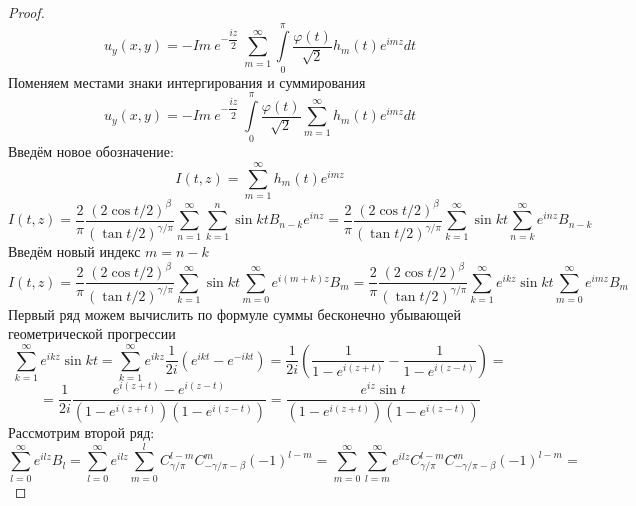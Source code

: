 \documentclass[12pt, a4paper]{extarticle}
\numberwithin{equation}{section}
\numberwithin{lemma}{section}
\numberwithin{definition}{section}
\numberwithin{notabene}{section}
\numberwithin{corollary}{section}
\begin{document}
\begin{proof}
\begin{equation*}
	\end{equation*}
	\begin{equation*}
	u_y(x,y)  = -  Im \ e^{-\dfrac{iz}{2}}\ \sum\limits_{m=1}^{\infty}  \int\limits_0^\pi \dfrac{\varphi(t)}{\sqrt2}  h_{m}(t)  e^{im z}  dt
\end{equation*}
	Поменяем местами знаки интергирования и суммирования
	\begin{equation*}
		u_y(x,y)  = -  Im \ e^{-\dfrac{iz}{2}}\  \int\limits_0^\pi \dfrac{\varphi(t)}{\sqrt2}  \sum\limits_{m=1}^{\infty}   h_{m}(t)  e^{im z}  dt
	\end{equation*}
	Введём новое обозначение:
	\begin{equation*}
		I(t,z) = \sum\limits_{m=1}^{\infty}  h_{m}(t)  e^{im z}
	\end{equation*}
	\begin{equation*}
		I(t,z) =\dfrac{2}{\pi}\dfrac{(2\cos{t/2})^\beta}{(\tan{t/2})^{\gamma/\pi}} \sum\limits_{n=1}^{\infty}   \sum\limits_{k=1}^n \sin{kt} B_{n-k} e^{inz} = 
		\dfrac{2}{\pi}\dfrac{(2\cos{t/2})^\beta}{(\tan{t/2})^{\gamma/\pi}} \sum\limits_{k=1}^{\infty} \sin{kt} \sum\limits_{n=k}^{\infty} e^{inz} B_{n-k}
	\end{equation*}
	Введём новый индекс $m = n - k$
	\begin{equation*}
		I(t,z) = \dfrac{2}{\pi}\dfrac{(2\cos{t/2})^\beta}{(\tan{t/2})^{\gamma/\pi}} \sum\limits_{k=1}^{\infty} \sin{kt} \sum\limits_{m =0 }^{\infty} e^{i(m+k)z} B_{m} = 
		\dfrac{2}{\pi}\dfrac{(2\cos{t/2})^\beta}{(\tan{t/2})^{\gamma/\pi}} \sum\limits_{k=1}^{\infty} e^{ikz}\sin{kt} \sum\limits_{m =0 }^{\infty} e^{imz} B_{m}
	\end{equation*}
	Первый ряд можем вычислить по формуле суммы бесконечно убывающей геометрической прогрессии
	\begin{equation*}
		 \sum\limits_{k=1}^{\infty} e^{ikz}\sin{kt} =  \sum\limits_{k=1}^{\infty} e^{ikz}\dfrac{1}{2i}\left(e^{ikt} - e^{-ikt}\right) = \dfrac1{2i} \left(\dfrac{1}{1 - e^{i(z+t)}} -  \dfrac{1}{1 - e^{i(z-t)}}\right) = 
	\end{equation*}
	\begin{equation*}
		= \dfrac{1}{2i}  \dfrac{e^{i(z+t)} - e^{i(z-t)}}{\left(1 - e^{i(z+t)} \right) \left(1 - e^{i(z-t)}\right)} =  \dfrac{e^{iz} \sin{t}}{\left(1 - e^{i(z+t)} \right) \left(1 - e^{i(z-t)}\right)}
	\end{equation*}
	Рассмотрим второй ряд:
	\begin{equation*}
		\sum\limits_{l =0 }^{\infty} e^{ilz} B_{l} = \sum\limits_{l =0 }^{\infty} e^{ilz} \sum\limits_{m=0}^{l} C^{l - m}_{\gamma/\pi} C^{m}_{-\gamma/\pi - \beta} (-1)^{l-m} = \sum\limits_{m=0}^{\infty} \sum\limits_{l=m}^{\infty} e^{ilz} C^{l - m}_{\gamma/\pi} C^{m}_{-\gamma/\pi - \beta} (-1)^{l-m} = 

\end{equation*}
\end{proof}
\end{document}
